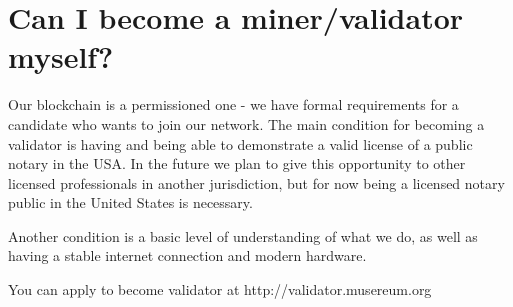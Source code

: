 \documentclass[12pt]{report}
\begin{document}
\section{Can I become a miner/validator myself?}
\label{blockchain-miner}
Our blockchain is a permissioned one - we have formal requirements for a candidate who wants to join our network. The main condition for becoming a validator is having and being able to demonstrate a valid license of a public notary in the USA. In the future we plan to give this opportunity to other licensed professionals in another jurisdiction, but for now being a licensed notary public in the United States is necessary.

Another condition is a basic level of understanding of what we do, as well as having a stable internet connection and modern hardware.

You can apply to become validator at http://validator.musereum.org
\end{document}
